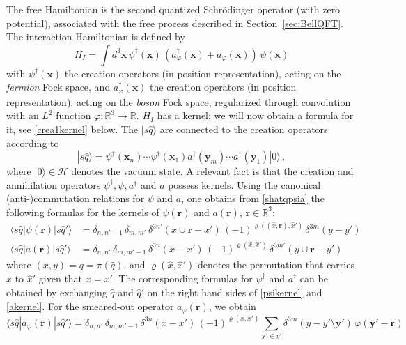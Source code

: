 \documentclass[12pt]{article}
\newcommand{\RRR}{\mathbb{R}} %
\newcommand{\1}{\mathbf{1}} %
\newcommand{\Hilbert}{\mathscr{H}}
\renewcommand{\sp}[2]{\langle #1 | #2 \rangle} %
\newcommand{\profile}{\varphi}
\newcommand{\covering}{\pi} %
\newcommand{\permutation}{\varrho} %
\newcommand{\vx}{{\boldsymbol x}} %
\newcommand{\vy}{{\boldsymbol y}}
\newcommand{\vr}{{\boldsymbol r}}
\newcommand{\inter}{{I}} %
\begin{document}
The free Hamiltonian is the second quantized Schr\"odinger operator
(with zero potential), associated with the free process described in
Section~\ref{sec:BellQFT}.  The interaction Hamiltonian is defined by
\begin{equation}\label{HIdef}
   H_\inter = \int d^3\vx \, \psi^\dag(\vx)\, (a^\dag_\profile(\vx) +
   a_{\profile}(\vx))\, \psi(\vx)
\end{equation}
with $\psi^\dag(\vx)$ the creation operators  (in position
representation), acting on the \emph{fermion} Fock space, and
$a^\dag_\profile(\vx)$ the creation operators  (in position
representation), acting on the \emph{boson} Fock space, regularized
through convolution with an $L^2$ function $\profile:\RRR^3 \to \RRR$.
$H_\inter$ has a kernel; we will now obtain a formula for it, see
\eqref{crea1kernel} below. The $|s\hat{q} \rangle$ are connected to
the creation operators according to
\begin{equation}\label{shatqpsia}
   |s\hat{q}\rangle = \psi^\dag(\vx_n) \cdots
    \psi^\dag(\vx_1) a^\dag(\vy_m) \cdots a^\dag(\vy_1) |0\rangle\,,
\end{equation}
where $|0\rangle \in \Hilbert$ denotes the vacuum state. A relevant
fact is that the creation and annihilation operators
$\psi^\dag,\psi,a^\dag$ and $a$ possess kernels. Using the canonical
(anti\nobreakdash-)commutation relations for $\psi$ and $a$, one obtains
from
\eqref{shatqpsia} the following formulas for the kernels of
$\psi(\vr)$ and $a(\vr)$, $\vr \in \RRR^3$:
\begin{align}
   \sp{s\hat{q}}{\psi(\vr)|s\hat{q}'} &= \delta_{n,n'-1} \,
   \delta_{m,m'} \,
   \delta^{3n'}(x \cup \vr -x') \, (-1)^{\permutation((\hat{x},
   \vr),\hat{x}')} \, \delta^{3m}(y-y') \label{psikernel} \\
   \sp{s\hat{q}}{a(\vr)|s\hat{q}'} &= \delta_{n,n'} \,
   \delta_{m,m'-1} \, \delta^{3n}(x-x') \,
   (-1)^{\permutation(\hat{x},\hat{x}')} \,
   \delta^{3m'}(y \cup \vr - y') \label{akernel}
\end{align}
where $(x,y) = q = \covering(\hat{q})$, and $\permutation
(\hat{x},\hat{x}')$ denotes the permutation that carries $\hat{x}$ to
$\hat{x}'$ given that $x=x'$. The corresponding formulas for
$\psi^\dag$ and $a^\dag$ can be obtained by exchanging $\hat{q}$ and
$\hat{q}'$ on the right hand sides of \eqref{psikernel} and
\eqref{akernel}.  For the smeared-out operator $a_\profile(\vr)$, we
obtain
\begin{equation}\label{aprofilekernel}
   \sp{s\hat{q}}{a_\profile(\vr)|s\hat{q}'} = \delta_{n,n'} \,
   \delta_{m,m'-1} \, \delta^{3n}(x-x') \,
   (-1)^{\permutation(\hat{x},\hat{x}')} \sum_{\vy' \in y'}
   \delta^{3m}(y- y'\setminus \vy') \, \profile(\vy' - \vr)
\end{equation}
\end{document}
